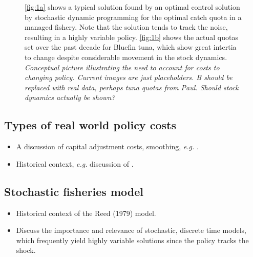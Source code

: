 \documentclass[authoryear, review, 12pt]{elsarticle}
\newcommand{\cdb}[1]{{\it \color{darkgreen} #1}}
\begin{document}
\begin{figure}[ht]
  \begin{center}
  \end{center}
  \caption{\ref{fig:1a} shows a typical solution found by an optimal
  control solution by stochastic dynamic programming for the optimal catch
  quota in a managed fishery.  Note that the solution tends to track the
  noise, resulting in a highly variable policy.  \ref{fig:1b} shows the
  actual quotas set over the past decade for Bluefin tuna, which show
  great intertia to change despite considerable movement in the stock
  dynamics.  \cdb{Conceptual picture illustrating the need to account
  for costs to changing policy. Current images are just placeholders.
  B should be replaced with real data, perhaps tuna quotas from Paul.
  Should stock dynamics actually be shown?}}
  \label{fig:1}
\end{figure}


\subsection{Types of real world policy costs}

\begin{itemize}
  \item A discussion of capital adjustment costs, smoothing, \emph{e.g.} \citet{Singh2006}.
  \item Historical context, \emph{e.g.} discussion of \citep{Bohm1974, Reed1979, Xepapadeas1992}.  
\end{itemize}
\subsection{Stochastic fisheries model}
\begin{itemize}
\item Historical context of the Reed (1979) model.  
\item Discuss the importance and relevance of stochastic, discrete time models, which frequently yield highly variable solutions since the policy tracks the shock.  
\end{itemize}
\end{document}
